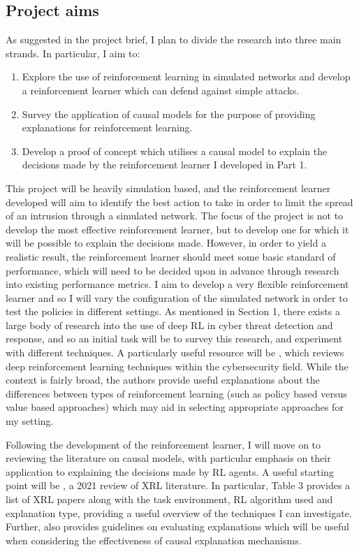\documentclass{article}
\begin{document}
\subsection{Project aims}
As suggested in the project brief, I plan to divide the research into three main strands. In particular, I aim to:
\begin{enumerate}
    \item Explore the use of reinforcement learning in simulated networks and develop a reinforcement learner which can defend against simple attacks.
    \item Survey the application of causal models for the purpose of providing explanations for reinforcement learning.
    \item Develop a proof of concept which utilises a causal model to explain the decisions made by the reinforcement learner I developed in Part 1. 
\end{enumerate}

\noindent This project will be heavily simulation based, and the reinforcement learner developed will aim to identify the best action to take in order to limit the spread of an intrusion through a simulated network. The focus of the project is not to develop the most effective reinforcement learner, but to develop one for which it will be possible to explain the decisions made. However, in order to yield a realistic result, the reinforcement learner should meet some basic standard of performance, which will need to be decided upon in advance through research into existing performance metrics. I aim to develop a very flexible reinforcement learner and so I will vary the configuration of the simulated network in order to test the policies in different settings. As mentioned in Section 1, there exists a large body of research into the use of deep RL in cyber threat detection and response, and so an initial task will be to survey this research, and experiment with different techniques. A particularly useful resource will be \cite{sewak2022deep}, which reviews deep reinforcement learning techniques within the cybersecurity field. While the context is fairly broad, the authors provide useful explanations about the differences between types of reinforcement learning (such as policy based versus value based approaches) which may aid in selecting appropriate approaches for my setting. 

Following the development of the reinforcement learner, I will move on to reviewing the literature on causal models, with particular emphasis on their application to explaining the decisions made by RL agents. A useful starting point will be \cite{heuillet2021explainability}, a 2021 review of XRL literature. In particular, Table 3 provides a list of XRL papers along with the task environment, RL algorithm used and explanation type, providing a useful overview of the techniques I can investigate. Further, \cite{heuillet2021explainability} also provides guidelines on evaluating explanations which will be useful when considering the effectiveness of causal explanation mechanisms. 
\end{document}

